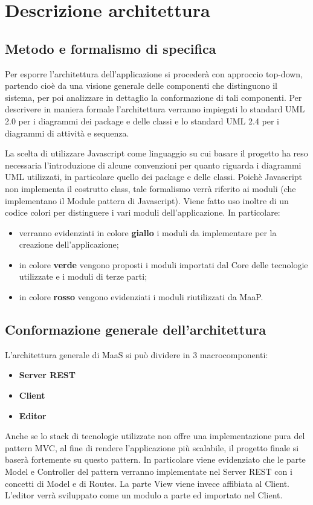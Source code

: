 \newpage
\section{Descrizione architettura}
\subsection{Metodo e formalismo di specifica}

Per esporre l'architettura dell'applicazione si procederà con approccio top-down, partendo cioè da una visione generale delle componenti che distinguono il sistema, per poi analizzare in dettaglio la conformazione di tali componenti.
Per descrivere in maniera formale l'architettura verranno impiegati lo standard UML 2.0 per i diagrammi dei package e delle classi e lo standard UML 2.4 per i diagrammi di attività e sequenza.

La scelta di utilizzare Javascript come linguaggio su cui basare il progetto ha reso necessaria l'introduzione di alcune convenzioni per quanto riguarda i diagrammi UML utilizzati, in particolare quello dei package e delle classi.
Poichè Javascript non implementa il costrutto class, tale formalismo verrà riferito ai moduli (che implementano il Module pattern di Javascript).
Viene fatto uso inoltre di un codice colori per distinguere i vari moduli dell'applicazione. In particolare:

\begin{itemize}
\item verranno evidenziati in colore \textbf{giallo} i moduli da implementare per la creazione dell'applicazione;
\item in colore \textbf{verde} vengono proposti i moduli importati dal Core delle tecnologie utilizzate e i moduli di terze parti;
\item in colore \textbf{rosso} vengono evidenziati i moduli riutilizzati da MaaP.
\end{itemize}

\subsection{Conformazione generale dell'architettura}
L'architettura generale di MaaS si può dividere in 3 macrocomponenti:
\begin{itemize}
\item \textbf{Server REST} 
\item \textbf{Client} 
\item \textbf{Editor}
\end{itemize}
Anche se lo stack di tecnologie utilizzate non offre una implementazione pura del pattern MVC, al fine di rendere l'applicazione più scalabile, il progetto finale si baserà fortemente su questo pattern. In particolare viene evidenziato che  le parte Model e Controller del pattern verranno implementate nel Server REST con i concetti di Model e di Routes. La parte View viene invece affibiata al Client. 
L'editor verrà sviluppato come un modulo a parte ed importato nel Client. %

